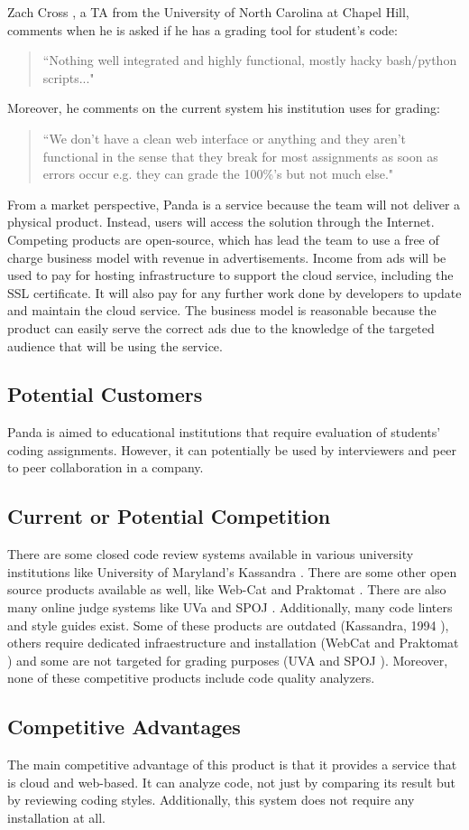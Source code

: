 
Zach Cross \cite{Zach}, a TA from the
University of North Carolina at Chapel Hill, comments when he is asked if he has
a grading tool for student's code: \begin{quote} ``Nothing well integrated and
highly functional, mostly hacky bash/python scripts..." \end{quote} Moreover, he
comments on the current system his institution uses for grading: \begin{quote}
``We don't have a clean web interface or anything and they aren't functional in
the sense that they break for most assignments as soon as errors occur e.g. they
can grade the 100\%'s but not much else." \end{quote}

From a market perspective, Panda is a service because the team
will not deliver a physical product. Instead, users will access the solution
through the Internet. Competing products are open-source, which has lead the
team to use a free of charge business model with revenue in advertisements.
Income from ads will be used to pay for hosting infrastructure to support the
cloud service, including the SSL certificate. It will also pay for any further
work done by developers to update and maintain the cloud service. The business
model is reasonable because the product can easily serve the correct ads due to
the knowledge of the targeted audience that will be using the service.

\subsection{Potential Customers}

Panda is aimed to educational institutions that
require evaluation of students' coding assignments. However, it can potentially
be used by interviewers and peer to peer collaboration in a company.

\subsection{Current or Potential Competition}

There are some closed code review systems available in various university
institutions like University of Maryland's Kassandra \cite{Matt1994}. There are
some other open source products available as well, like Web-Cat \cite{WebCat}
and Praktomat \cite{Praktomat}. There are also many online judge systems like
UVa \cite{UVA} and SPOJ \cite{SPOJ}. Additionally, many code linters and style
guides exist. Some of these products are outdated (Kassandra, 1994 \cite{Matt1994}), others
require dedicated infraestructure and installation (WebCat \cite{WebCat} and Praktomat \cite{Praktomat}) and
some are not targeted for grading purposes (UVA \cite{UVA} and SPOJ \cite{SPOJ}). Moreover,
none of these competitive products include code quality analyzers.

\subsection{Competitive Advantages}

The main competitive advantage of this product is that it provides a service
that is cloud and web-based. It can analyze code, not just by comparing its
result but by reviewing coding styles. Additionally, this system does not
require any installation at all.